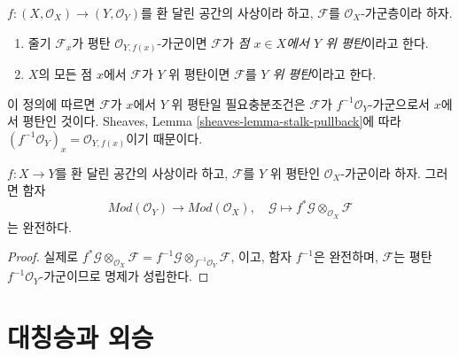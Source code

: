 \begin{definition}
\label{definition-flat-module}
$f : (X, \mathcal{O}_X) \to (Y, \mathcal{O}_Y)$를 환 달린 공간의
사상이라 하고, $\mathcal{F}$를 $\mathcal{O}_X$-가군층이라 하자.
\begin{enumerate}
\item 줄기 $\mathcal{F}_x$가 평탄 $\mathcal{O}_{Y, f(x)}$-가군이면
$\mathcal{F}$가 {\it 점 $x \in X$에서 $Y$ 위 평탄}이라고 한다.
\item $X$의 모든 점 $x$에서 $\mathcal{F}$가 $Y$ 위 평탄이면
$\mathcal{F}$를 {\it $Y$ 위 평탄}이라고 한다.
\end{enumerate}
\end{definition}

\noindent
이 정의에 따르면 $\mathcal{F}$가 $x$에서 $Y$ 위 평탄일 필요충분조건은
$\mathcal{F}$가 $f^{-1}\mathcal{O}_Y$-가군으로서 $x$에서 평탄인 것이다.
Sheaves, Lemma \ref{sheaves-lemma-stalk-pullback}에 따라
$(f^{-1}\mathcal{O}_Y)_x = \mathcal{O}_{Y, f(x)}$이기 때문이다.

\begin{lemma}
\label{lemma-pullback-tensor-flat-module}
$f : X \to Y$를 환 달린 공간의 사상이라 하고, $\mathcal{F}$를
$Y$ 위 평탄인 $\mathcal{O}_X$-가군이라 하자. 그러면 함자
$$
\textit{Mod}(\mathcal{O}_Y) \to \textit{Mod}(\mathcal{O}_X),\quad
\mathcal{G} \longmapsto f^*\mathcal{G} \otimes_{\mathcal{O}_X} \mathcal{F}
$$
는 완전하다.
\end{lemma}

\begin{proof}
실제로
$f^*\mathcal{G} \otimes_{\mathcal{O}_X} \mathcal{F} =
f^{-1}\mathcal{G} \otimes_{f^{-1}\mathcal{O}_Y} \mathcal{F}$,
이고, 함자 $f^{-1}$은 완전하며, $\mathcal{F}$는 평탄
$f^{-1}\mathcal{O}_Y$-가군이므로 명제가 성립한다.
\end{proof}














\section{대칭승과 외승}
\label{section-symmetric-exterior}

